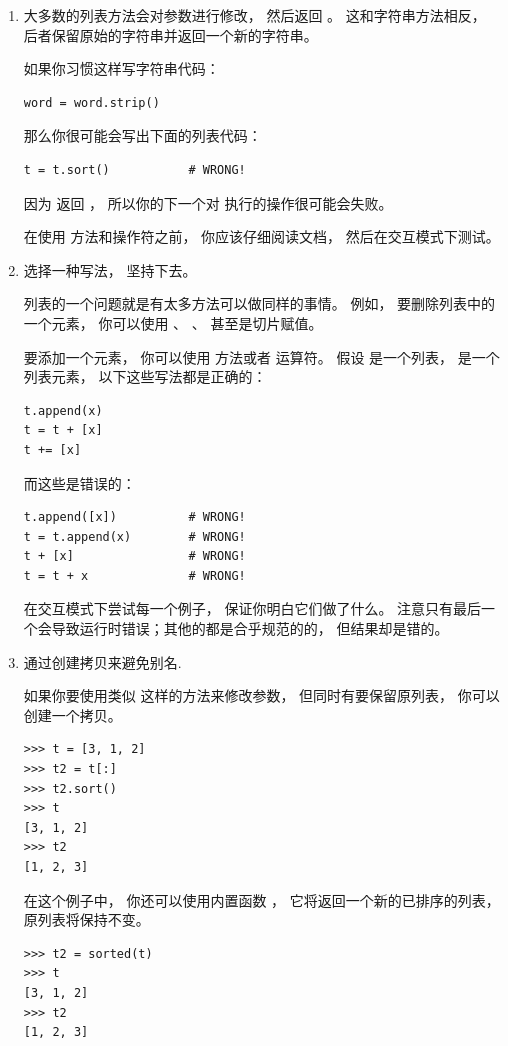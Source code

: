 \begin{enumerate}

\item 大多数的列表方法会对参数进行修改， 然后返回  。  这和字符串方法相反， 后者保留原始的字符串并返回一个新的字符串。

如果你习惯这样写字符串代码：

\begin{lstlisting}
word = word.strip()
\end{lstlisting}

那么你很可能会写出下面的列表代码：

\begin{lstlisting}
t = t.sort()           # WRONG!
\end{lstlisting}

因为  返回  ， 所以你的下一个对  执行的操作很可能会失败。

在使用  方法和操作符之前， 你应该仔细阅读文档， 然后在交互模式下测试。

\item 选择一种写法， 坚持下去。

列表的一个问题就是有太多方法可以做同样的事情。   例如， 要删除列表中的一个元素， 你可以使用  、  、  甚至是切片赋值。

 要添加一个元素， 你可以使用  方法或者 \li{+} 运算符。  假设  是一个列表，  是一个列表元素， 以下这些写法都是正确的：

\begin{lstlisting}
t.append(x)
t = t + [x]
t += [x]
\end{lstlisting}

而这些是错误的：

\begin{lstlisting}
t.append([x])          # WRONG!
t = t.append(x)        # WRONG!
t + [x]                # WRONG!
t = t + x              # WRONG!
\end{lstlisting}

在交互模式下尝试每一个例子， 保证你明白它们做了什么。   注意只有最后一个会导致运行时错误；其他的都是合乎规范的的， 但结果却是错的。


\item 通过创建拷贝来避免别名.
  

如果你要使用类似  这样的方法来修改参数，
   但同时有要保留原列表， 你可以创建一个拷贝。


\begin{lstlisting}
>>> t = [3, 1, 2]
>>> t2 = t[:]
>>> t2.sort()
>>> t
[3, 1, 2]
>>> t2
[1, 2, 3]
\end{lstlisting}

在这个例子中， 你还可以使用内置函数 ， 它将返回一个新的已排序的列表， 原列表将保持不变。

\begin{lstlisting}
>>> t2 = sorted(t)
>>> t
[3, 1, 2]
>>> t2
[1, 2, 3]
\end{lstlisting}

\end{enumerate}


